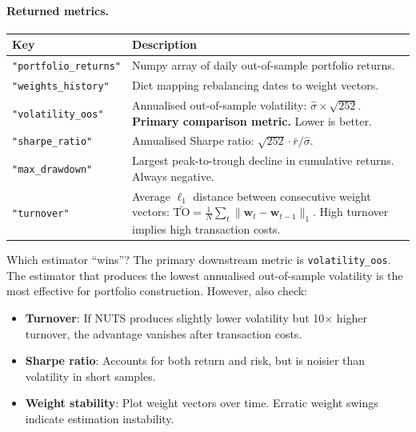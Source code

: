 \documentclass[11pt,a4paper]{article}
\begin{document}
\paragraph{Returned metrics.}
\begin{center}
\begin{tabular}{@{}lp{8.5cm}@{}}
\toprule
Key & Description \\
\midrule
\texttt{"portfolio\_returns"} & Numpy array of daily out-of-sample portfolio returns. \\
\texttt{"weights\_history"} & Dict mapping rebalancing dates to weight vectors. \\
\texttt{"volatility\_oos"} & Annualised out-of-sample volatility: $\hat\sigma \times \sqrt{252}$. \textbf{Primary comparison metric.} Lower is better. \\
\texttt{"sharpe\_ratio"} & Annualised Sharpe ratio: $\sqrt{252} \cdot \bar{r} / \hat\sigma$. \\
\texttt{"max\_drawdown"} & Largest peak-to-trough decline in cumulative returns. Always negative. \\
\texttt{"turnover"} & Average $\ell_1$ distance between consecutive weight vectors: $\bar{\text{TO}} = \frac{1}{N}\sum_t \|\bm{w}_t - \bm{w}_{t-1}\|_1$. High turnover implies high transaction costs. \\
\bottomrule
\end{tabular}
\end{center}

\begin{outputguide}{Which estimator ``wins''?}
The primary downstream metric is \texttt{volatility\_oos}. The estimator that produces the lowest annualised out-of-sample volatility is the most effective for portfolio construction. However, also check:
\begin{itemize}[nosep]
  \item \textbf{Turnover}: If NUTS produces slightly lower volatility but 10$\times$ higher turnover, the advantage vanishes after transaction costs.
  \item \textbf{Sharpe ratio}: Accounts for both return and risk, but is noisier than volatility in short samples.
  \item \textbf{Weight stability}: Plot weight vectors over time. Erratic weight swings indicate estimation instability.
\end{itemize}
\end{outputguide}


\end{document}

